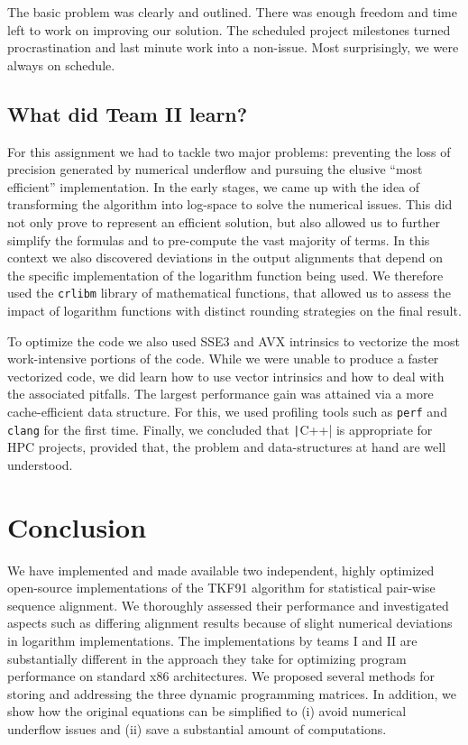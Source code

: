 \documentclass[runningheads,a4paper]{llncs}
\begin{document}
The basic problem was clearly and outlined. There was enough freedom and time left 
to work on improving our solution. The scheduled project milestones 
turned procrastination and last minute work into a non-issue. 
Most surprisingly, we were always on schedule.



\subsection{What did Team II learn?}
For this assignment we had to tackle two major problems: preventing the loss of precision generated by numerical underflow and 
pursuing the elusive ``most efficient'' implementation. 
In the early stages, we came up with the idea of transforming the algorithm into log-space to solve the numerical issues. 
This did not only prove to represent an efficient solution, but also allowed us to further simplify the formulas and to pre-compute the vast majority of terms. 
In this context we also discovered deviations in the output alignments
that depend on the specific implementation of the logarithm function being used. 
We therefore used the \texttt{crlibm} library of mathematical functions, that allowed us to assess the impact of logarithm functions with distinct rounding strategies
on the final result.

To optimize the code we also used SSE3 and AVX intrinsics to vectorize the most work-intensive portions of the code. 
While we were unable to produce a faster vectorized code, we did learn how to use vector intrinsics and how to deal with the associated pitfalls. 
The largest performance gain was attained via a more cache-efficient data structure. 
For this, we used profiling tools such as \texttt{perf} and \texttt{clang} for the first time. 
Finally,  we concluded that \texttt|C++| is appropriate for HPC projects, provided that, the problem and data-structures at hand are well understood.


\section{Conclusion}
\label{conclusion}
We have implemented and made available two independent, highly optimized open-source implementations of the TKF91 algorithm for statistical pair-wise sequence alignment.
We thoroughly assessed their performance and investigated aspects such as differing alignment results because of slight numerical deviations in logarithm implementations.
The implementations by teams I and II are substantially different in the approach they take for optimizing program performance on standard x86 architectures. 
We proposed several methods for storing and addressing the three dynamic programming matrices. In addition, we show how the original equations can be simplified 
to (i) avoid numerical underflow issues and (ii) save a substantial amount of computations.
\end{document}

